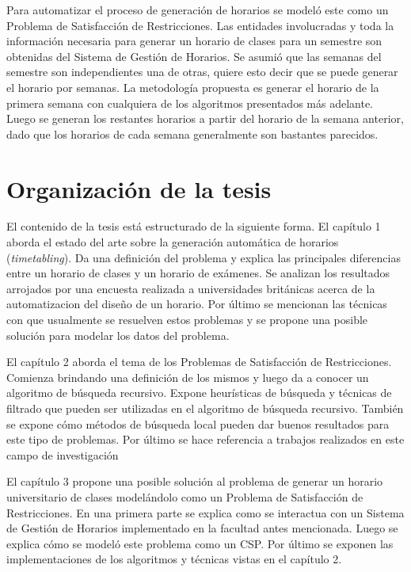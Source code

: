 \begin{introduction}
Para automatizar el proceso de generaci\'on de horarios se model\'o este como un Problema de Satisfacci\'on de Restricciones. Las entidades involucradas y toda la informaci\'on necesaria para generar un horario de clases para un semestre son obtenidas del Sistema de Gestión de Horarios. Se asumi\'o que las semanas del semestre son independientes una de otras, quiere esto decir que se puede generar el horario por semanas. La metodología propuesta es generar el horario de la primera semana con cualquiera de los algoritmos presentados más adelante. Luego se generan los restantes horarios a partir del horario de la semana anterior, dado que los horarios de cada semana generalmente son bastantes parecidos.

\section*{Organización de la tesis}

El contenido de la tesis está estructurado de la siguiente forma. El cap\'itulo 1 aborda el estado del arte sobre la generaci\'on autom\'atica de horarios (\emph{timetabling}). Da una definici\'on del problema y explica las principales diferencias entre un horario de clases y un horario de ex\'amenes. Se analizan los resultados arrojados por una encuesta realizada a universidades brit\'anicas acerca de la automatizacion del diseño de un horario. Por \'ultimo se mencionan las t\'ecnicas con que usualmente se resuelven estos problemas y se propone una posible soluci\'on para modelar los datos del problema.

El cap\'itulo 2 aborda el tema de los Problemas de Satisfacci\'on de Restricciones. Comienza brindando una definici\'on de los mismos y luego da a conocer un algoritmo de b\'usqueda recursivo. Expone heur\'isticas de b\'usqueda y t\'ecnicas de filtrado que pueden ser utilizadas en el algoritmo de b\'usqueda recursivo. Tambi\'en se expone c\'omo m\'etodos de b\'usqueda local pueden dar buenos resultados para este tipo de problemas. Por \'ultimo se hace referencia a trabajos realizados en este campo de investigaci\'on 

El cap\'itulo 3 propone una posible soluci\'on al problema de generar un horario universitario de clases model\'andolo como un Problema de Satisfacci\'on de Restricciones. En una primera parte se explica como se interactua con un Sistema de Gesti\'on de Horarios implementado en la facultad antes mencionada. Luego se explica c\'omo se model\'o este problema como un CSP. Por \'ultimo se exponen las implementaciones de los algoritmos y t\'ecnicas vistas en el cap\'itulo 2.


\end{introduction}
